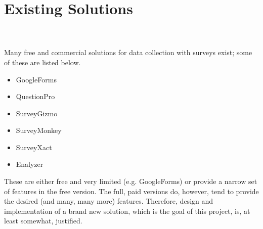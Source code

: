 \section{Existing Solutions}
\label{sec:existingsolutions}
\piotr \\\\
Many free and commercial solutions for data collection with surveys exist; some of these are listed below.
\begin{itemize}
\item GoogleForms
\item QuestionPro
\item SurveyGizmo
\item SurveyMonkey
\item SurveyXact
\item Enalyzer
\end{itemize}
  
These are either free and very limited (e.g. GoogleForms) or provide a narrow set of features in the free version. The full, paid versions do, however, tend to provide the desired (and many, many more) features. Therefore, design and implementation of a brand new solution, which is the goal of this project, is, at least somewhat, justified.